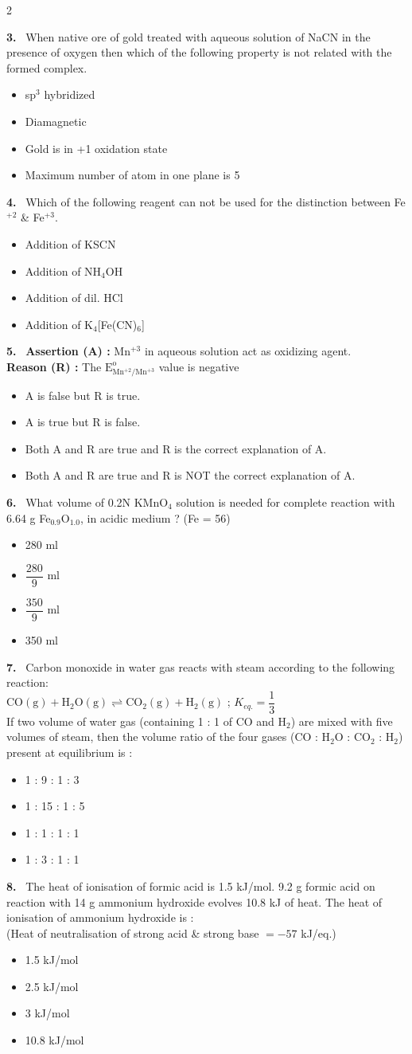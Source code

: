\documentclass[10pt]{extarticle}
\newcommand{\qn}[1]{\par\smallskip\noindent\textbf{#1.}~}
\newenvironment{qoptions}{\begin{itemize}[leftmargin=1.8em,itemsep=1pt,topsep=2pt,label={}]}{\end{itemize}}
\newcommand{\opt}[2]{\item[(#1)] #2}
\begin{document}
\begin{multicols}{2}
\qn{3} When native ore of gold treated with aqueous solution of NaCN in the presence of oxygen then which of the following property is not related with the formed complex.
\begin{qoptions}
\opt{A}{sp$^3$ hybridized}
\opt{B}{Diamagnetic}
\opt{C}{Gold is in +1 oxidation state}
\opt{D}{Maximum number of atom in one plane is 5}
\end{qoptions}

\qn{4} Which of the following reagent can not be used for the distinction between Fe$^{+2}$ \& Fe$^{+3}$.
\begin{qoptions}
\opt{A}{Addition of KSCN}
\opt{B}{Addition of NH$_4$OH}
\opt{C}{Addition of dil. HCl}
\opt{D}{Addition of K$_4$[Fe(CN)$_6$]}
\end{qoptions}

\qn{5} \textbf{Assertion (A) :} Mn$^{+3}$ in aqueous solution act as oxidizing agent.\\
\textbf{Reason (R) :} The $\mathrm{E^{o}_{Mn^{+2}/Mn^{+3}}}$ value is negative
\begin{qoptions}
\opt{A}{A is false but R is true.}
\opt{B}{A is true but R is false.}
\opt{C}{Both A and R are true and R is the correct explanation of A.}
\opt{D}{Both A and R are true and R is NOT the correct explanation of A.}
\end{qoptions}

\qn{6} What volume of 0.2N KMnO$_4$ solution is needed for complete reaction with 6.64 g Fe$_{0.9}$O$_{1.0}$, in acidic medium ? (Fe = 56)
\begin{qoptions}
\opt{A}{280 ml}
\opt{B}{$\dfrac{280}{9}$ ml}
\opt{C}{$\dfrac{350}{9}$ ml}
\opt{D}{350 ml}
\end{qoptions}

\qn{7} Carbon monoxide in water gas reacts with steam according to the following reaction:\\
$\mathrm{CO(g)+H_2O(g)\rightleftharpoons CO_2(g)+H_2(g)}$ ; $K_{eq.}=\dfrac13$\\
If two volume of water gas (containing 1 : 1 of CO and H$_2$) are mixed with five volumes of steam, then the volume ratio of the four gases (CO : H$_2$O : CO$_2$ : H$_2$) present at equilibrium is :
\begin{qoptions}
\opt{A}{1 : 9 : 1 : 3}
\opt{B}{1 : 15 : 1 : 5}
\opt{C}{1 : 1 : 1 : 1}
\opt{D}{1 : 3 : 1 : 1}
\end{qoptions}

\qn{8} The heat of ionisation of formic acid is 1.5 kJ/mol. 9.2 g formic acid on reaction with 14 g ammonium hydroxide evolves 10.8 kJ of heat. The heat of ionisation of ammonium hydroxide is :\\
(Heat of neutralisation of strong acid \& strong base $=-57$ kJ/eq.)
\begin{qoptions}
\opt{A}{1.5 kJ/mol}
\opt{B}{2.5 kJ/mol}
\opt{C}{3 kJ/mol}
\opt{D}{10.8 kJ/mol}
\end{qoptions}


\end{multicols}
\end{document}

